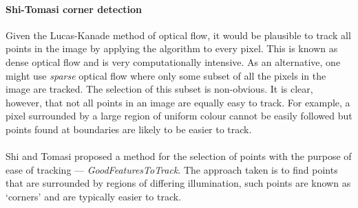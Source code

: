 \paragraph{Shi-Tomasi corner detection}
Given the Lucas-Kanade method of optical flow, it would be plausible to track all points in the image by applying the algorithm to every pixel. This is known as dense optical flow and is very computationally intensive.
 As an alternative, one might use \textit{sparse} optical flow where only some subset of all the pixels in the image are tracked. 
The selection of this subset is non-obvious. It is clear, however, that not all points in an image are equally easy to track. For example, a pixel surrounded by a large region of uniform colour cannot be easily followed but points
found at boundaries are likely to be easier to track. 
\\\\
Shi and Tomasi \cite{ShiTomasi} proposed a method for the selection of points with the purpose of ease of tracking --- \textit{GoodFeaturesToTrack}. 
The approach taken is to find points that are surrounded by regions of differing illumination, such points are known as `corners' and are typically easier to track.



